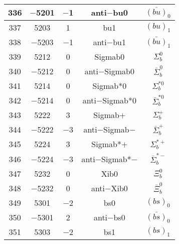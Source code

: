 \documentclass{article}
\begin{document}
\begin{table}[!htbp]
\begin{tabular}{|c|c|c|c|c|}
\hline
336 & $-$5201 & $-$1 & anti$-$bu\underline{\hspace{0.6em}}0 & $\bar{(bu)}_{0}$ \\
\hline
337 & 5203 & 1 & bu\underline{\hspace{0.6em}}1 & $(bu)_{1}$ \\
\hline
338 & $-$5203 & $-$1 & anti$-$bu\underline{\hspace{0.6em}}1 & $\bar{(bu)}_{1}$ \\
\hline
339 & 5212 & 0 & Sigma\underline{\hspace{0.6em}}b0 & $\Sigma_{b}^{0}$ \\
\hline
340 & $-$5212 & 0 & anti$-$Sigma\underline{\hspace{0.6em}}b0 & $\bar{\Sigma}_{b}^{0}$ \\
\hline
341 & 5214 & 0 & Sigma\underline{\hspace{0.6em}}b*0 & $\Sigma_{b}^{*0}$ \\
\hline
342 & $-$5214 & 0 & anti$-$Sigma\underline{\hspace{0.6em}}b*0 & $\bar{\Sigma}_{b}^{*0}$ \\
\hline
343 & 5222 & 3 & Sigma\underline{\hspace{0.6em}}b$+$ & $\Sigma_{b}^{+}$ \\
\hline
344 & $-$5222 & $-$3 & anti$-$Sigma\underline{\hspace{0.6em}}b$-$ & $\bar{\Sigma}_{b}^{+}$ \\
\hline
345 & 5224 & 3 & Sigma\underline{\hspace{0.6em}}b*$+$ & $\Sigma_{b}^{*+}$ \\
\hline
346 & $-$5224 & $-$3 & anti$-$Sigma\underline{\hspace{0.6em}}b*$-$ & $\bar{\Sigma}_{b}^{*-}$ \\
\hline
347 & 5232 & 0 & Xi\underline{\hspace{0.6em}}b0 & $\Xi_{b}^{0}$ \\
\hline
348 & $-$5232 & 0 & anti$-$Xi\underline{\hspace{0.6em}}b0 & $\bar{\Xi}_{b}^{0}$ \\
\hline
349 & 5301 & $-$2 & bs\underline{\hspace{0.6em}}0 & $(bs)_{0}$ \\
\hline
350 & $-$5301 & 2 & anti$-$bs\underline{\hspace{0.6em}}0 & $\bar{(bs)}_{0}$ \\
\hline
351 & 5303 & $-$2 & bs\underline{\hspace{0.6em}}1 & $(bs)_{1}$ \\

\end{tabular}
\end{table}
\end{document}
